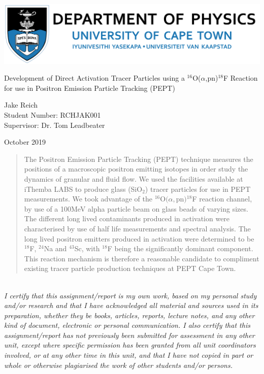 \documentclass[]{article}
\begin{document}
\thispagestyle{empty}
\begin{center}
	\begin{minipage}{0.75\linewidth}
		\centering
		\includegraphics[width=1\linewidth]{deptPhysics.jpg}\\
		\par
		\vspace{3cm}
		{{\Large Development of Direct Activation Tracer Particles using a ${}^{16}$O($\alpha$,pn)${}^{18}$F Reaction for use in Positron Emission Particle Tracking (PEPT)\par}}
		\vspace{3cm}
		{\Large Jake Reich\\Student Number: RCHJAK001 \\Supervisor: Dr. Tom Leadbeater\par}
		\vspace{8cm}
		{\Large October 2019}
	\end{minipage}
\end{center}
\clearpage


\begin{abstract}
	 The Positron Emission Particle Tracking (PEPT) technique measures the positions of a macroscopic positron emitting isotopes in order study the dynamics of granular and fluid flow. We used the facilities available at iThemba LABS to produce glass (SiO$_2$) tracer particles for use in PEPT measurements. We took advantage of the ${}^{16}$O$(\alpha,$pn$){}^{18}$F reaction channel, by use of a 100MeV alpha particle beam on glass beads of varying sizes. The different long lived contaminants produced in activation were characterised by use of half life measurements and spectral analysis. The long lived positron emitters produced in activation were determined to be ${}^{18}$F, ${}^{24}$Na and ${}^{43}$Sc, with ${}^{18}$F being the significantly dominant component. This reaction mechanism is therefore a reasonable candidate to compliment existing tracer particle production techniques at PEPT Cape Town. 
 \end{abstract}\vfill
~\\
\textit{I certify that this assignment/report is my own work, based on my personal study and/or research and that I have acknowledged all material and sources used in its preparation, whether they be books, articles, reports, lecture notes, and any other kind of document, electronic or personal communication. I also certify that this assignment/report has not previously been submitted for assessment in any other unit, except where specific permission has been granted from all unit coordinators involved, or at any other time in this unit, and that I have not copied in part or whole or otherwise plagiarised the work of other students and/or persons.}
\end{document}
